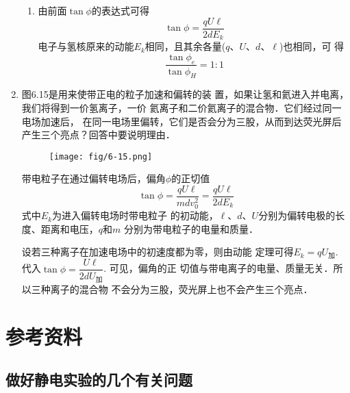 \begin{enumerate}
\begin{solution}
\begin{enumerate}
\item 由前面$\tan\phi$的表达式可得
\[\tan\phi=\frac{qU\ell}{2dE_k}\]
电子与氢核原来的动能$E_k$相同，且其余各量($q$、$U$、$d$、$\ell$)也相同，可
得
\[\frac{\tan\phi_e}{\tan\phi_H}=1:1\]
\end{enumerate}
\end{solution}

\item 图6.15是用来使带正电的粒子加速和偏转的装
置，如果让氢和氦进入并电离，我们将得到一价氢离子，一价
氦离子和二价氦离子的混合物．它们经过同一电场加速后，
在同一电场里偏转，它们是否会分为三股，从而到达荧光屏后
产生三个亮点？回答中要说明理由．

\begin{figure}[htp]\centering
    \texttt{[image: fig/6-15.png]}
        \caption{}
        \end{figure}

\begin{solution}
    带电粒子在通过偏转电场后，偏角$\phi$的正切值
    \[\tan\phi=\frac{qU\ell}{mdv_0^2}=\frac{qU\ell}{2dE_k}\]
式中$E_k$为进入偏转电场时带电粒子
    的初动能，$\ell$、$d$、$U$分别为偏转电极的长度、距离和电压，$q$和$m$
    分别为带电粒子的电量和质量．

    设若三种离子在加速电场中的初速度都为零，则由动能
    定理可得$E_k=qU_{\text{加}}$. 代入$\tan\phi=\dfrac{U\ell }{2dU_{\text{加}}}$. 可见，偏角的正
    切值与带电离子的电量、质量无关．所以三种离子的混合物
    不会分为三股，荧光屏上也不会产生三个亮点．
\end{solution}

\end{enumerate}


























\section{参考资料}
\subsection{做好静电实验的几个有关问题}
